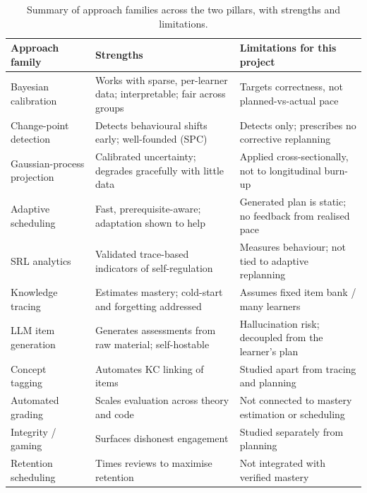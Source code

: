 \documentclass[12pt]{report}
\begin{document}
\begin{table}[htbp]
\centering
\footnotesize
\caption{Summary of approach families across the two pillars, with strengths and limitations.}
\label{tab:litsummary}
\begin{tabular}{p{3.0cm} p{4.2cm} p{4.2cm}}
\toprule
\textbf{Approach family} & \textbf{Strengths} & \textbf{Limitations for this project} \\
\midrule
Bayesian calibration~\cite{chen2024,zanellati2024,zambrano2024,mai2025} & Works with sparse, per-learner data; interpretable; fair across groups & Targets correctness, not planned-vs-actual pace \\
Change-point detection~\cite{saqr2026,qiao2026,boca2024,cheng2024} & Detects behavioural shifts early; well-founded (SPC) & Detects only; prescribes no corrective replanning \\
Gaussian-process projection~\cite{perezsuay2024,chenyao2025,lin2024,huang2025,kayande2025} & Calibrated uncertainty; degrades gracefully with little data & Applied cross-sectionally, not to longitudinal burn-up \\
Adaptive scheduling~\cite{islam2024,fabregar2025,pagano2026,liu2025} & Fast, prerequisite-aware; adaptation shown to help & Generated plan is static; no feedback from realised pace \\
SRL analytics~\cite{alhazbi2024,debarba2025,uzun2025,butt2025} & Validated trace-based indicators of self-regulation & Measures behaviour; not tied to adaptive replanning \\
Knowledge tracing~\cite{clst2024,maml2026,dkvmn2024,conceptkt2026,graphkt2025,slam2026,su2025,keenkt2026} & Estimates mastery; cold-start and forgetting addressed & Assumes fixed item bank / many learners \\
LLM item generation~\cite{itemgen2024,lecturequiz2026,nikolovski2025,burke2025,alamoudi2025} & Generates assessments from raw material; self-hostable & Hallucination risk; decoupled from the learner's plan \\
Concept tagging~\cite{kctag2024,concepttag2024,qmatrix2026,hendrawan2026} & Automates KC linking of items & Studied apart from tracing and planning \\
Automated grading~\cite{llmgrade2024,essay2024,jukiewicz2026,senanayake2024,baral2024} & Scales evaluation across theory and code & Not connected to mastery estimation or scheduling \\
Integrity / gaming~\cite{gaming2026,integrity2024,erdem2025} & Surfaces dishonest engagement & Studied separately from planning \\
Retention scheduling~\cite{spaced2025,retrieval2025} & Times reviews to maximise retention & Not integrated with verified mastery \\
\bottomrule
\end{tabular}
\end{table}
\end{document}
